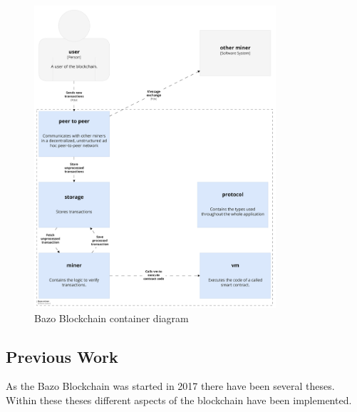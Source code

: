 \begin{figure}[H]
	\begin{center}
	\includegraphics[width=0.8\textwidth]{./images/BAZO_Container}
	\caption{Bazo Blockchain container diagram}
	\label{systemcontainerdiagram}
	\end{center}
\end{figure}
\pagebreak

\subsection{Previous Work}
As the Bazo Blockchain was started in 2017 there have been several theses. Within these theses different aspects of the blockchain have been implemented. 

